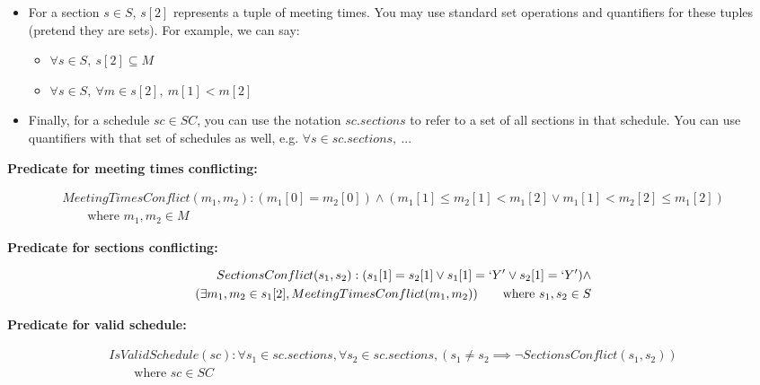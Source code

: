 \documentclass[fontsize=11pt]{article}
\begin{document}
\begin{enumerate}
\begin{enumerate}
\begin{itemize}
\item
For a section $s \in S$, $s[2]$ represents a tuple of meeting times.
You may use standard set operations and quantifiers for these tuples (pretend they are sets).
For example, we can say:

    \begin{itemize}
    \item $\forall s \in S,~ s[2] \subseteq M$
    \item $\forall s \in S,~ \forall m \in s[2],~ m[1] < m[2]$
    \end{itemize}

\item
Finally, for a schedule $sc \in SC$, you can use the notation $sc.sections$ to refer to a set of all sections in that schedule.
You can use quantifiers with that set of schedules as well, e.g.
$\forall s \in sc.sections,~ ...$
\end{itemize}

\textbf{Predicate for meeting times conflicting:}

\begin{align*}
MeetingTimesConflict(m_1, m_2) : (m_1[0] = m_2[0]) \land (m_1[1]\leq m_2[1]<m_1[2] \lor m_1[1] < m_2[2]\leq m_1[2]) \\
\qquad \text{where $m_1, m_2 \in M$}
\end{align*}

\smallskip

\textbf{Predicate for sections conflicting:}

\begin{align*}
SectionsConflict(s_1, s_2) : (s_1[1] = s_2[1] \lor s_1[1]=`Y' \lor s_2[1]=`Y') \land \\ (\exists m_1,m_2 \in s_1[2], MeetingTimesConflict(m_1, m_2))
\qquad \text{where $s_1, s_2 \in S$}
\end{align*}

\smallskip

\textbf{Predicate for valid schedule:}

\begin{align*}
IsValidSchedule(sc) : \forall s_1 \in sc.sections, \forall s_2 \in sc.sections, (s_1 \neq s_2 \implies \lnot SectionsConflict(s_1, s_2)) \\
\qquad \text{where $sc \in SC$}
\end{align*}



\end{enumerate}
\end{enumerate}
\end{document}
